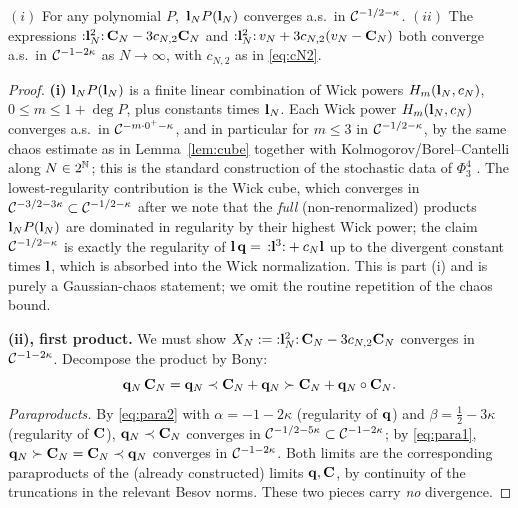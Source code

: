 \begin{qonelemma}\label{lem:std}
$(i)$ For any polynomial $P$, $\,\mathbf{l}_N P(\mathbf{l}_N)$ converges a.s.\ in
$\mathcal{C}^{-1/2-\kappa}$. $(ii)$ The expressions ${:}\mathbf{l}_N^2{:}\,\mathbf{C}_N-3c_{N,2}\mathbf{C}_N$
and ${:}\mathbf{l}_N^2{:}\,v_N+3c_{N,2}(v_N-\mathbf{C}_N)$ both converge a.s.\ in
$\mathcal{C}^{-1-2\kappa}$ as $N\to\infty$, with $c_{N,2}$ as in \eqref{eq:cN2}.
\end{qonelemma}

\begin{proof}
\textbf{(i)} $\mathbf{l}_N P(\mathbf{l}_N)$ is a finite linear combination of Wick powers
$H_{m}(\mathbf{l}_N,c_N)$, $0\le m\le 1+\deg P$, plus constants times $\mathbf{l}_N$.
Each Wick power $H_m(\mathbf{l}_N,c_N)$ converges a.s.\ in $\mathcal{C}^{-m\cdot 0^+ -\kappa}$,
and in particular for $m\le 3$ in $\mathcal{C}^{-1/2-\kappa}$, by the same chaos estimate as in
Lemma~\ref{lem:cube} together with Kolmogorov/Borel--Cantelli along $N\in2^{\mathbb{N}}$;
this is the standard construction of the stochastic data of $\Phi^4_3$
\cite{CC18}. The lowest-regularity contribution is the Wick cube,
which converges in $\mathcal{C}^{-3/2-3\kappa}\subset\mathcal{C}^{-1/2-\kappa}$ after we note that the
\emph{full} (non-renormalized) products $\mathbf{l}_NP(\mathbf{l}_N)$ are dominated in
regularity by their highest Wick power; the claim $\mathcal{C}^{-1/2-\kappa}$ is exactly the
regularity of $\mathbf{l}\,\mathbf{q}=\,{:}\mathbf{l}^3{:}+c_N\mathbf{l}$ up to the divergent constant times
$\mathbf{l}$, which is absorbed into the Wick normalization. This is part (i) and is
purely a Gaussian-chaos statement; we omit the routine repetition of the chaos bound.

\medskip
\textbf{(ii), first product.} We must show
$X_N:={:}\mathbf{l}_N^2{:}\,\mathbf{C}_N-3c_{N,2}\mathbf{C}_N$ converges in $\mathcal{C}^{-1-2\kappa}$.
Decompose the product by Bony:
\begin{equation}\label{eq:bony1}
\mathbf{q}_N\,\mathbf{C}_N=\mathbf{q}_N\prec\mathbf{C}_N+\mathbf{q}_N\succ\mathbf{C}_N+\mathbf{q}_N\circ\mathbf{C}_N .
\end{equation}
\emph{Para\-products.} By \eqref{eq:para2} with
$\alpha=-1-2\kappa$ (regularity of $\mathbf{q}$) and $\beta=\tfrac12-3\kappa$
(regularity of $\mathbf{C}$), $\mathbf{q}_N\prec\mathbf{C}_N$ converges in
$\mathcal{C}^{-1/2-5\kappa}\subset\mathcal{C}^{-1-2\kappa}$; by \eqref{eq:para1},
$\mathbf{q}_N\succ\mathbf{C}_N=\mathbf{C}_N\prec\mathbf{q}_N$ converges in $\mathcal{C}^{-1-2\kappa}$. Both limits
are the corresponding paraproducts of the (already constructed) limits
$\mathbf{q},\mathbf{C}$, by continuity of the truncations in the relevant Besov norms.
These two pieces carry \emph{no} divergence.


\end{proof}
